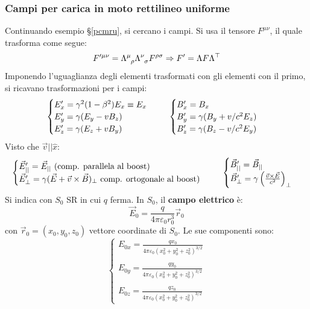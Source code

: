 \documentclass[10pt, a4paper]{scrartcl}
\numberwithin{equation}{subsection}
\theoremstyle{style1}
\begin{document}
\subsubsection{Campi per carica in moto rettilineo uniforme}
Continuando esempio \S\ref{pcmru}, si cercano i campi. Si usa il tensore $F^{\mu  \nu} $, il quale trasforma come segue:
\begin{equation}
	F'^{\mu \nu} = \Lambda\indices{^\mu _\rho } \Lambda\indices{^\nu _\sigma } F^{\rho  \sigma } \Rightarrow F' = \Lambda F \Lambda^\top  
\end{equation}
Imponendo l'uguaglianza degli elementi trasformati con gli elementi con il primo, si ricavano trasformazioni per i campi:
\begin{equation}
	\begin{cases}
		E'_x = \gamma^2 (1-\beta ^2 ) E_x \equiv E_x\\
		E'_y = \gamma(E_y - vB_z) \\
		E'_z = \gamma(E_z + vB_y)
	\end{cases}\hspace{.5cm} \begin{cases}
		B'_x = B_x\\
		B'_y = \gamma(B_y + v / c^2 E_z)\\
		B'_z = \gamma(B_z - v / c^2 E_y)
	\end{cases}
\end{equation}
Visto che $\vec{v}| | \hat{x}$:
\begin{equation}
	\begin{cases}
		\vec{E}'_{ | |} = \vec{E}_{| |} \text{ (comp. parallela al boost)} \\
		\vec{E}'_{\perp} = \gamma(\vec{E}+\vec{v}\times \vec{B})_{\perp}  \text{ comp. ortogonale al boost)} 
	\end{cases}\hspace{.5cm} \begin{cases}
		\vec{B}'_{| | } = \vec{B}_{| |}\\
		\vec{B}'_{\perp} = \gamma\left(\frac{\vec{v}\times \vec{E}}{c^2}\right) _{\perp} 
	\end{cases}
\end{equation}
Si indica con $S_0$ SR in cui $q$ ferma. In $S_0$, il \textbf{campo elettrico} \`e:
\begin{equation}
	\vec{E}_0 = \frac{q}{4\pi \varepsilon _0 r_0^3}\vec{r}_0
\end{equation}
con $\vec{r}_0 = (x_0,y_0,z_0)$ vettore coordinate di $S_0$. Le sue componenti sono:
\begin{equation}
	\begin{cases}
		\displaystyle E_{0x} = \frac{q x_0}{4\pi \varepsilon _0 (x_0^2 + y_0^2 + z_0^2)^{3 / 2} }\\
		\\
		\displaystyle E_{0y} = \frac{q y_0}{4\pi \varepsilon _0 (x_0^2 + y_0^2 + z_0^2)^{3 / 2} }\\
		\\
\displaystyle E_{0z} =\frac{q z_0}{4\pi \varepsilon _0 (x_0^2 + y_0^2 + z_0^2)^{3 / 2} }
	\end{cases}
\end{equation}
\end{document}
